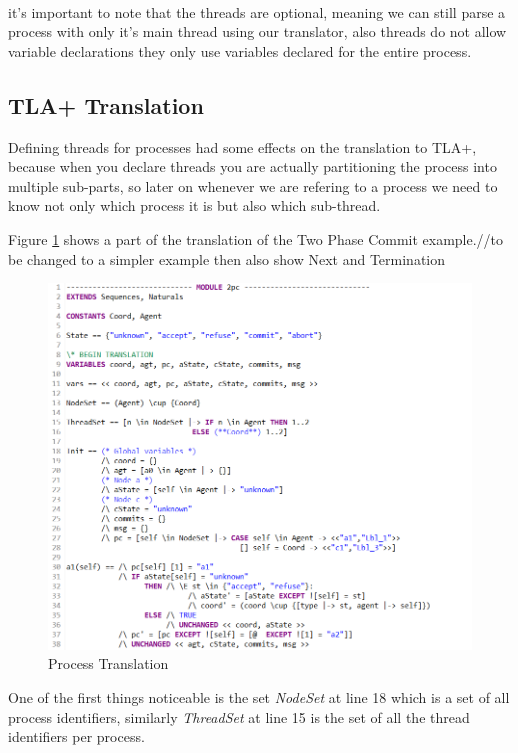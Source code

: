 \documentclass{thesul}
\begin{document}
\hfill\\
it's important to note that the threads are optional, meaning we can still parse a process with only it's main thread using our translator, also threads do not allow variable declarations they only use variables declared for the entire process.

\subsection{TLA+ Translation}

Defining threads for processes had some effects on the translation to TLA+, because when you declare threads you are actually partitioning the process into multiple sub-parts, so later on whenever we are refering to a process we need to know not only which process it is but also which sub-thread.

Figure \ref{fig:processtla} shows a part of the translation of the Two Phase Commit example.//to be changed to a simpler example then also show Next and Termination


\begin{figure}[h!]
\centering
\includegraphics[scale=0.7]{ProcessTLA.png}
\caption{Process Translation}
\label{fig:processtla}
\end{figure}
\FloatBarrier

One of the first things noticeable is the set \textit{NodeSet} at line 18 which is a set of all process identifiers, similarly \textit{ThreadSet} at line 15 is the set of all the thread identifiers per process.
\end{document}
